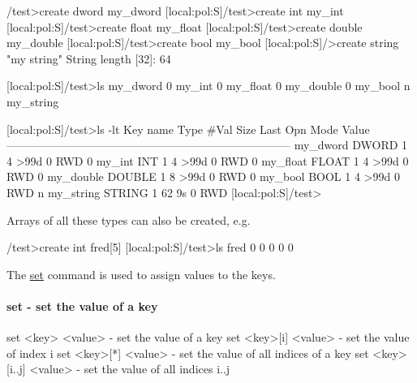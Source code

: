 \begin{DoxyCode}
/test>create dword my_dword
[local:pol:S]/test>create int my_int
[local:pol:S]/test>create float my_float
[local:pol:S]/test>create double my_double
[local:pol:S]/test>create bool my_bool
[local:pol:S]/>create string "my string"
String length [32]: 64

[local:pol:S]/test>ls
my_dword                        0
my_int                          0
my_float                        0
my_double                       0
my_bool                         n
my_string

[local:pol:S]/test>ls -lt
Key name                        Type    #Val  Size  Last Opn Mode Value
---------------------------------------------------------------------------
my_dword                        DWORD   1     4     >99d 0   RWD  0
my_int                          INT     1     4     >99d 0   RWD  0
my_float                        FLOAT   1     4     >99d 0   RWD  0
my_double                       DOUBLE  1     8     >99d 0   RWD  0
my_bool                         BOOL    1     4     >99d 0   RWD  n
my_string                       STRING  1     62    9s   0   RWD
[local:pol:S]/test>
\end{DoxyCode}


Arrays of all these types can also be created, e.g. 
\begin{DoxyCode}
/test>create int fred[5]
[local:pol:S]/test>ls
fred
                                0
                                0
                                0
                                0
                                0
\end{DoxyCode}


The \hyperlink{RC_odbedit_examples_RC_odbedit_set}{set} command is used to assign values to the keys.



\hypertarget{RC_odbedit_examples_RC_odbedit_set}{}\paragraph{set -\/ set the value of a key}\label{RC_odbedit_examples_RC_odbedit_set}

\begin{DoxyCode}
set <key> <value>       - set the value of a key
set <key>[i] <value>    - set the value of index i
set <key>[*] <value>    - set the value of all indices of a key
set <key>[i..j] <value> - set the value of all indices i..j
\end{DoxyCode}


